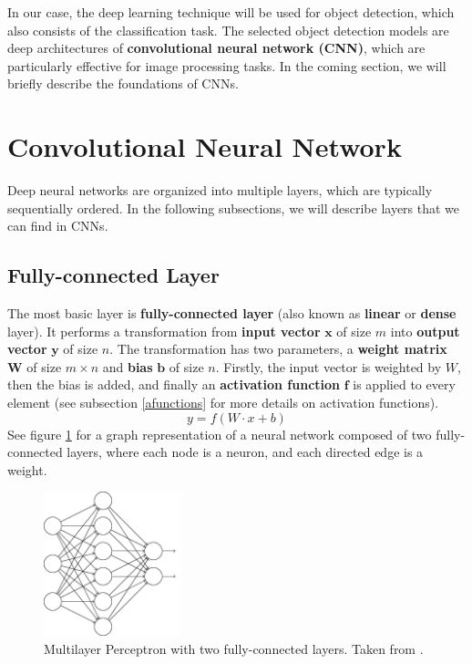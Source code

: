 In our case, the deep learning technique will be used for object detection, which also consists of the classification task. The selected object detection models are deep architectures of \textbf{convolutional neural network (CNN)}, which are particularly effective for image processing tasks. In the coming section, we will briefly describe the foundations of CNNs. 

\section{Convolutional Neural Network}
Deep neural networks are organized into multiple layers, which are typically sequentially ordered. In the following subsections, we will describe layers that we can find in CNNs.

\subsection{Fully-connected Layer}
The most basic layer is \textbf{fully-connected layer} (also known as \textbf{linear} or \textbf{dense} layer). It performs a transformation from \textbf{input vector} $\boldsymbol{x}$ of size $m$ into \textbf{output vector} $\boldsymbol{y}$ of size $n$. The transformation has two parameters, a \textbf{weight matrix} $\boldsymbol{W}$ of size $m \times n$ and \textbf{bias} $\boldsymbol{b}$ of size $n$. Firstly, the input vector is weighted by $W$, then the bias is added, and finally an \textbf{activation function} $\boldsymbol{f}$ is applied to every element (see subsection \ref{afunctions} for more details on activation functions).
$$
y = f(W\cdot x + b)
$$
See figure \ref{fig:fcl} for a graph representation of a neural network composed of two fully-connected layers, where each node is a neuron, and each directed edge is a weight.

\begin{figure}[h]
    \centering
    \includegraphics[width=4cm]{Sources/Figures/fully_connected_layer.png}
    \caption{Multilayer Perceptron with two fully-connected layers. Taken from \cite{nielsenneural}.}
    \label{fig:fcl}
\end{figure}

